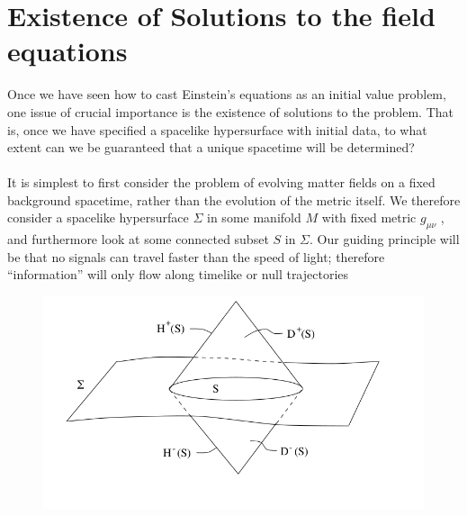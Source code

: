  \section{Existence of Solutions to the field equations}
 Once we have seen how to cast Einstein’s equations as an initial value problem, one issue
 of crucial importance is the existence of solutions to the problem. That is, once we have
 specified a spacelike hypersurface with initial data, to what extent can we be guaranteed
 that a unique spacetime will be determined?\\
 \\
 It is simplest to first consider the problem of evolving matter fields on a fixed background
 spacetime, rather than the evolution of the metric itself. We therefore consider a spacelike
 hypersurface $Σ$ in some manifold $M$ with fixed metric $g_{μν}$ , and furthermore look at some
 connected subset $S$ in $ Σ$. Our guiding principle will be that no signals can travel faster than
 the speed of light; therefore “information” will only flow along timelike or null trajectories
 
 \begin{figure}[h]
 	\centering
 	\includegraphics[width=0.7\linewidth]{gfx/CauchyHorizonsGR}
 	\caption{}
 	\label{fig:cauchyhorizonsgr}
 \end{figure}
 
